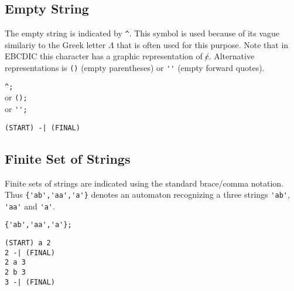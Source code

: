 \subsection{Empty String}
The empty string is indicated by \verb#^#.
This symbol is used because of its vague similariy to the Greek letter
$\Lambda$ that is often used for this purpose.
Note that in EBCDIC this character has a graphic representation of
$\not c$.
Alternative representations is \verb#()# (empty parentheses)
or \verb#''# (empty forward quotes).
\begin{center}\begin{minipage}[t]{3in}\begin{minipage}[t]{3in}\begin{tabbing}
\qquad \= \verb#^;#\\
or \> \verb#();#\\
or \> \verb#'';#
\end{tabbing}\end{minipage}\end{minipage}
\begin{minipage}[t]{1.6in}\begin{verbatim}
(START) -| (FINAL)
\end{verbatim}\end{minipage}\end{center}

\subsection{Finite Set of Strings}
Finite sets of strings are indicated using the standard brace/comma notation.
Thus \verb#{'ab','aa','a'}# denotes an automaton recognizing a three
strings \verb#'ab'#, \verb#'aa'# and \verb#'a'#.
\begin{center}\begin{minipage}[t]{3in}\begin{minipage}[t]{3in}\begin{tabbing}
\qquad \= \verb#{'ab','aa','a'};#
\end{tabbing}\end{minipage}\end{minipage}
\begin{minipage}[t]{1.6in}\begin{verbatim}
(START) a 2
2 -| (FINAL)
2 a 3
2 b 3
3 -| (FINAL)
\end{verbatim}\end{minipage}\end{center}

